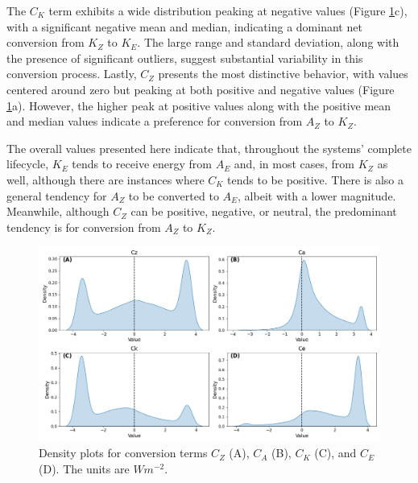 The $C_K$ term exhibits a wide distribution peaking at negative values (Figure \ref{fig:ridge_plot_Conversion_Terms_total}c), with a significant negative mean and median, indicating a dominant net conversion from $K_Z$ to $K_E$. The large range and standard deviation, along with the presence of significant outliers, suggest substantial variability in this conversion process. Lastly, $C_Z$ presents the most distinctive behavior, with values centered around zero but peaking at both positive and negative values (Figure \ref{fig:ridge_plot_Conversion_Terms_total}a). However, the higher peak at positive values along with the positive mean and median values indicate a preference for conversion from $A_Z$ to $K_Z$. 

The overall values presented here indicate that, throughout the systems' complete lifecycle, $K_E$ tends to receive energy from $A_E$ and, in most cases, from $K_Z$ as well, although there are instances where $C_K$ tends to be positive. There is also a general tendency for $A_Z$ to be converted to $A_E$, albeit with a lower magnitude. Meanwhile, although $C_Z$ can be positive, negative, or neutral, the predominant tendency is for conversion from $A_Z$ to $K_Z$.

\begin{figure}[!htbp]
\centering
\includegraphics[width=\textwidth]{figs_5/ridge_plot_Conversion_Terms_total.png}
\caption[Density Plots - Conversion Terms]{Density plots for conversion terms $C_Z$ (A), $C_A$ (B), $C_K$ (C), and $C_E$ (D). The units are $W m^{-2}$.}
\label{fig:ridge_plot_Conversion_Terms_total}
\end{figure}

